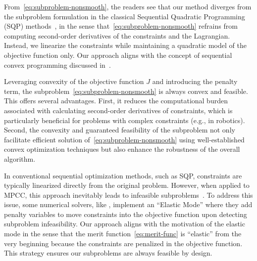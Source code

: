 From~\eqref{eq:subproblem-nonsmooth}, the readers see that our method diverges from the subproblem formulation in the classical Sequential Quadratic Programming (SQP) methods~\cite{sqp-method, fletcher2000practical, jordana2023stagewise}, in the sense that~\eqref{eq:subproblem-nonsmooth} refrains from computing second-order derivatives of the constraints and the Lagrangian. Instead, we linearize the constraints while maintaining a quadratic model of the objective function only. Our approach aligns with the concept of sequential convex programming discussed in~\cite{scp-01,scp-02,scp-03}.

Leveraging convexity of the objective function $J$ and introducing the penalty term, the subproblem~\eqref{eq:subproblem-nonsmooth} is always convex and feasible. This offers several advantages. First, it reduces the computational burden associated with calculating second-order derivatives of constraints, which is particularly beneficial for problems with complex constraints (e.g., in robotics). Second, the convexity and guaranteed feasibility of the subproblem not only facilitate efficient solution of~\eqref{eq:subproblem-nonsmooth} using well-established convex optimization techniques but also enhance the robustness of the overall algorithm.

\begin{remark}
    In conventional sequential optimization methods, such as SQP, constraints are typically linearized directly from the original problem. However, when applied to MPCC, this approach inevitably leads to infeasible subproblems~\cite{SIOPT-FLETCHER-2006,SIOPT-ANITESCU-2005}. To address this issue, some numerical solvers, like \snopt, implement an ``Elastic Mode'' where they add penalty variables to move constraints into the objective function upon detecting subproblem infeasibility.
    Our approach aligns with the motivation of the elastic mode in the sense that the merit function~\eqref{eq:merit-func} is ``elastic'' from the very beginning because the constraints are penalized in the objective function.
    This strategy ensures our subproblems are always feasible by design.
\end{remark}




